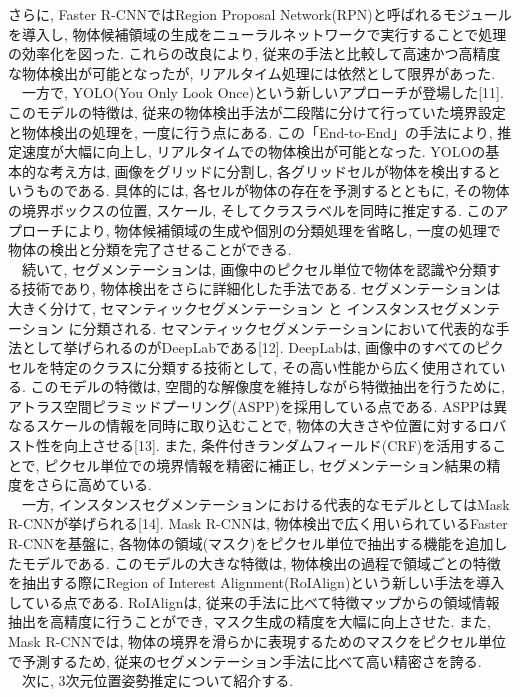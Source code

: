 さらに, Faster R-CNNではRegion Proposal Network(RPN)と呼ばれるモジュールを導入し, 物体候補領域の生成をニューラルネットワークで実行することで処理の効率化を図った. 
これらの改良により, 従来の手法と比較して高速かつ高精度な物体検出が可能となったが, リアルタイム処理には依然として限界があった. \\
　一方で, YOLO(You Only Look Once)という新しいアプローチが登場した[11]. 
このモデルの特徴は, 従来の物体検出手法が二段階に分けて行っていた境界設定と物体検出の処理を, 一度に行う点にある. 
この「End-to-End」の手法により, 推定速度が大幅に向上し, リアルタイムでの物体検出が可能となった. 
YOLOの基本的な考え方は, 画像をグリッドに分割し, 各グリッドセルが物体を検出するというものである. 
具体的には, 各セルが物体の存在を予測するとともに, その物体の境界ボックスの位置, スケール, そしてクラスラベルを同時に推定する. 
このアプローチにより, 物体候補領域の生成や個別の分類処理を省略し, 一度の処理で物体の検出と分類を完了させることができる. \\
　続いて, セグメンテーションは, 画像中のピクセル単位で物体を認識や分類する技術であり, 物体検出をさらに詳細化した手法である. 
セグメンテーションは大きく分けて, セマンティックセグメンテーション と インスタンスセグメンテーション に分類される. 
セマンティックセグメンテーションにおいて代表的な手法として挙げられるのがDeepLabである[12]. 
DeepLabは, 画像中のすべてのピクセルを特定のクラスに分類する技術として, その高い性能から広く使用されている. 
このモデルの特徴は, 空間的な解像度を維持しながら特徴抽出を行うために, アトラス空間ピラミッドプーリング(ASPP)を採用している点である. 
ASPPは異なるスケールの情報を同時に取り込むことで, 物体の大きさや位置に対するロバスト性を向上させる[13]. 
また, 条件付きランダムフィールド(CRF)を活用することで, ピクセル単位での境界情報を精密に補正し, セグメンテーション結果の精度をさらに高めている. \\
　一方, インスタンスセグメンテーションにおける代表的なモデルとしてはMask R-CNNが挙げられる[14]. 
Mask R-CNNは, 物体検出で広く用いられているFaster R-CNNを基盤に, 各物体の領域(マスク)をピクセル単位で抽出する機能を追加したモデルである. 
このモデルの大きな特徴は, 物体検出の過程で領域ごとの特徴を抽出する際にRegion of Interest Alignment(RoIAlign)という新しい手法を導入している点である. 
RoIAlignは, 従来の手法に比べて特徴マップからの領域情報抽出を高精度に行うことができ, マスク生成の精度を大幅に向上させた. 
また, Mask R-CNNでは, 物体の境界を滑らかに表現するためのマスクをピクセル単位で予測するため, 従来のセグメンテーション手法に比べて高い精密さを誇る. \\
　次に, 3次元位置姿勢推定について紹介する. 
